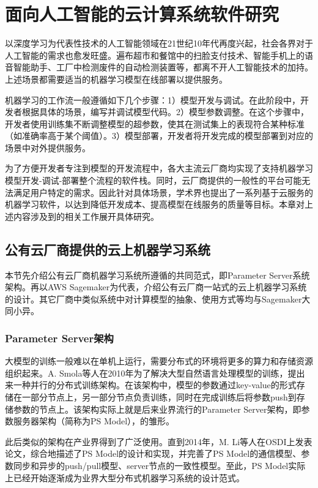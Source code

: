 
\chapter{面向人工智能的云计算系统软件研究}
以深度学习为代表性技术的人工智能领域在21世纪10年代再度兴起，社会各界对于人工智能的需求也愈发旺盛。遍布超市和餐馆中的扫脸支付技术、智能手机上的语音智能助手、工厂中检测废件的自动检测装置等，都离不开人工智能技术的加持。上述场景都需要适当的机器学习模型在线部署以提供服务。

机器学习的工作流一般遵循如下几个步骤：1）模型开发与调试。在此阶段中，开发者根据具体的场景，编写并调试模型代码。2）模型参数调整。在这个步骤中，开发者使用训练集不断调整模型的超参数，使其在测试集上的表现符合某种标准（如准确率高于某个阈值）。3）模型部署，开发者将开发完成的模型部署到对应的场景中对外提供服务。

为了方便开发者专注到模型的开发流程中，各大主流云厂商均实现了支持机器学习模型开发-调试-部署整个流程的软件栈。同时，云厂商提供的一般性的平台可能无法满足用户特定的需求。因此针对具体场景，学术界也提出了一系列基于云服务的机器学习软件，以达到降低开发成本、提高模型在线服务的质量等目标。本章对上述内容涉及到的相关工作展开具体研究。

\section{公有云厂商提供的云上机器学习系统}

本节先介绍公有云厂商机器学习系统所遵循的共同范式，即Parameter Server系统架构。再以AWS Sagemaker为代表，介绍公有云厂商一站式的云上机器学习系统的设计。其它厂商中类似系统中对计算模型的抽象、使用方式等均与Sagemaker大同小异。

\subsection{Parameter Server架构}
大模型的训练一般难以在单机上运行，需要分布式的环境将更多的算力和存储资源组织起来。A. Smola等人\parencite{smola2010an}在2010年为了解决大型自然语言处理模型的训练，提出来一种并行的分布式训练架构。在该架构中，模型的参数通过key-value的形式存储在一部分节点上，另一部分节点负责训练，同时在完成训练后将参数push到存储参数的节点上。该架构实际上就是后来业界流行的Parameter Server架构，即参数服务器架构（简称为PS Model），的雏形。

此后类似的架构在产业界得到了广泛使用。直到2014年，M. Li等人\parencite{186214}在OSDI上发表论文，综合地描述了PS Model的设计和实现，并完善了PS Model的通信模型、参数同步和异步的push/pull模型、server节点的一致性模型。至此，PS Model实际上已经开始逐渐成为业界大型分布式机器学习系统的设计范式。

